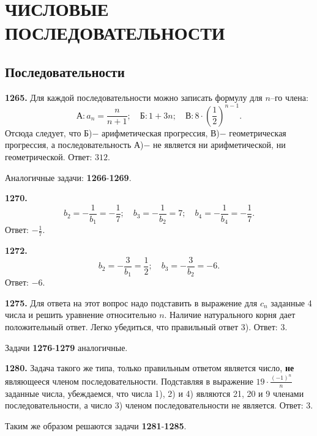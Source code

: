 \section{ЧИСЛОВЫЕ ПОСЛЕДОВАТЕЛЬНОСТИ}
\subsection{Последовательности}


\textbf{1265.}  Для каждой  последовательности можно записать формулу для $n$–го члена: $$\text{А}: a_n=\frac{n}{n+1};\quad \text{Б}: 1+3n;\quad \text{В}: 8\cdot\left(\frac{1}{2}\right)^{n-1}.$$
Отсюда следует, что Б)$-$ арифметическая прогрессия,  В)$-$ геометрическая прогрессия, а последовательность А)$-$ не является ни арифметической, ни геометрической. \newline \null \hspace*{\fill} Ответ: $312$. 

Аналогичные задачи: \textbf{1266}-\textbf{1269}.

\textbf{1270.} $$b_2=-\frac{1}{b_1}=-\frac{1}{7};\quad b_3=-\frac{1}{b_2}=7;\quad b_4=-\frac{1}{b_4}=-\frac{1}{7}.$$ \newline \null \hspace*{\fill} Ответ: $-\frac{1}{7}$. 

\textbf{1272.} $$b_2=-\frac{3}{b_1}=\frac{1}{2};\quad b_3=-\frac{3}{b_2}=-6.$$ \newline \null \hspace*{\fill} Ответ: $-6$. 

\textbf{1275.} Для ответа на этот вопрос надо подставить в выражение для $c_n$ заданные 4 числа и решить уравнение относительно $n$. Наличие натурального корня дает положительный ответ. Легко убедиться, что правильный ответ 3). \newline \null \hspace*{\fill} Ответ: 3. 

Задачи \textbf{1276}-\textbf{1279} аналогичные.

\textbf{1280.} Задача такого же типа, только правильным ответом является число, \textbf{не} являющееся членом последовательности. Подставляя в выражение $19\cdot\frac{\left(-1\right)^n}{n}$ заданные числа, убеждаемся, что числа 1), 2) и 4) являются 21, 20 и 9 членами последовательности, а число 3) членом последовательности не является. \newline \null \hspace*{\fill} Ответ: 3.  

Таким же образом решаются задачи \textbf{1281}-\textbf{1285}.

